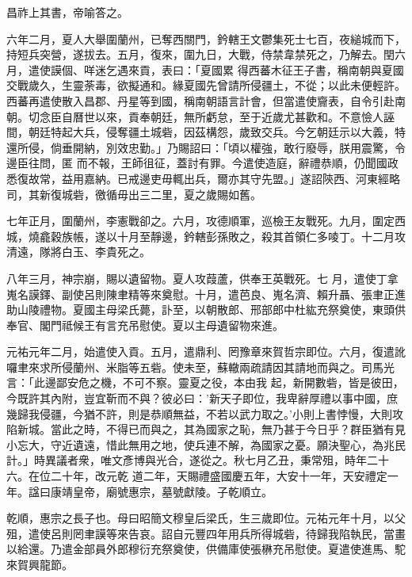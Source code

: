 \begin{pinyinscope}
 昌祚上其書，帝喻答之。



 六年二月，夏人大舉圍蘭州，已奪西關門，鈐轄王文鬱集死士七百，夜縋城而下，持短兵突營，遂拔去。五月，復來，圍九日，大戰，侍禁韋禁死之，乃解去。閏六月，遣使謨個、咩迷乞遇來貢，表曰：「夏國累
 得西蕃木征王子書，稱南朝與夏國交戰歲久，生靈荼毒，欲擬通和。緣夏國先曾請所侵疆土，不從；以此未便輕許。西蕃再遣使散入昌郡、丹星等到國，稱南朝語言計會，但當遣使齎表，自令引赴南朝。切念臣自曆世以來，貢奉朝廷，無所虧怠，至于近歲尤甚歡和。不意憸人誣間，朝廷特起大兵，侵奪疆土城砦，因茲構怨，歲致交兵。今乞朝廷示以大義，特還所侵，倘垂開納，別效忠勤。」乃賜詔曰：「頃以權強，敢行廢辱，朕用震驚，令邊臣往問，匿
 而不報，王師徂征，蓋討有罪。今遣使造庭，辭禮恭順，仍聞國政悉復故常，益用嘉納。已戒邊吏毋輒出兵，爾亦其守先盟。」遂詔陝西、河東經略司，其新復城砦，徼循毋出三二里，夏之歲賜如舊。



 七年正月，圍蘭州，李憲戰卻之。六月，攻德順軍，巡檢王友戰死。九月，圍定西城，燒龕穀族帳，遂以十月至靜邊，鈐轄彭孫敗之，殺其首領仁多㖫丁。十二月攻清遠，隊將白玉、李貴死之。



 八年三月，神宗崩，賜以遺留物。夏人攻葭蘆，供奉王英戰死。七
 月，遣使丁拿嵬名謨鐸、副使呂則陳聿精等來奠慰。十月，遣芭良、嵬名濟、賴升聶、張聿正進助山陵禮物。夏國主母梁氏薨，訃至，以朝散郎、邢部郎中杜紘充祭奠使，東頭供奉官、閣門祗候王有言充吊慰使。夏以主母遺留物來進。



 元祐元年二月，始遣使入貢。五月，遣鼎利、罔豫章來賀哲宗即位。六月，復遣訛囉聿來求所侵蘭州、米脂等五砦。使未至，蘇轍兩疏請因其請地而與之。司馬光言：「此邊鄙安危之機，不可不察。靈夏之役，本由我
 起，新開數砦，皆是彼田，今既許其內附，豈宜靳而不與？彼必曰：'新天子即位，我卑辭厚禮以事中國，庶幾歸我侵疆，今猶不許，則是恭順無益，不若以武力取之。'小則上書悖慢，大則攻陷新城。當此之時，不得已而與之，其為國家之恥，無乃甚于今日乎？群臣猶有見小忘大，守近遺遠，惜此無用之地，使兵連不解，為國家之憂。願決聖心，為兆民計。」時異議者衆，唯文彥博與光合，遂從之。秋七月乙丑，秉常殂，時年二十六。在位二十年，改元乾
 道二年，天賜禮盛國慶五年，大安十一年，天安禮定一年。諡曰康靖皇帝，廟號惠宗，墓號獻陵。子乾順立。



 乾順，惠宗之長子也。母曰昭簡文穆皇后梁氏，生三歲即位。元祐元年十月，以父殂，遣使呂則罔聿謨等來告哀。詔自元豐四年用兵所得城砦，待歸我陷執民，當畫以給還。乃遣金部員外郎穆衍充祭奠使，供備庫使張楙充吊慰使。夏遣使進馬、駝來賀興龍節。




\end{pinyinscope}
